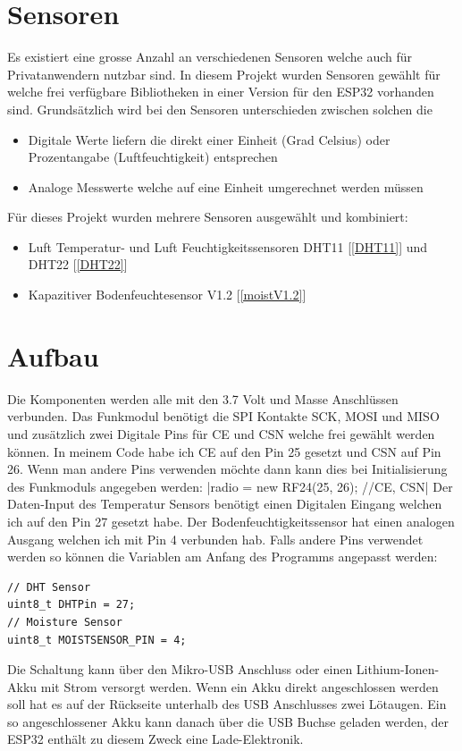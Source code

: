 \documentclass[
  12pt, %
  a4paper, %
  twoside, %
  openany, %
  numbers=noenddot, %
  BCOR=5mm, %
  parskip=half*, %
  thesis, %
]{bfhbook}
\begin{document}
\section{Sensoren}
 Es existiert eine grosse Anzahl an verschiedenen Sensoren welche auch für Privatanwendern nutzbar sind. In diesem Projekt wurden Sensoren gewählt für welche frei verfügbare Bibliotheken in einer Version für den ESP32 vorhanden sind. Grundsätzlich wird bei den Sensoren unterschieden zwischen solchen die 
 \begin{itemize}
	 \item Digitale Werte liefern die direkt einer Einheit (Grad Celsius) oder Prozentangabe (Luftfeuchtigkeit) entsprechen
	  \item Analoge Messwerte welche auf eine Einheit umgerechnet werden müssen
\end{itemize}
Für dieses Projekt wurden mehrere Sensoren ausgewählt und kombiniert:
\begin{itemize}
	\item Luft Temperatur- und Luft Feuchtigkeitssensoren DHT11 [\ref{DHT11}] und DHT22 [\ref{DHT22}]
	\item Kapazitiver Bodenfeuchtesensor V1.2 [\ref{moistV1.2}]
\end{itemize}
\section{Aufbau}
Die Komponenten werden alle mit den 3.7 Volt und Masse Anschlüssen verbunden. Das Funkmodul benötigt die SPI Kontakte SCK, MOSI und MISO und zusätzlich zwei Digitale Pins für CE und CSN welche frei gewählt werden können. In meinem Code habe ich CE auf den Pin 25 gesetzt und CSN auf Pin 26. Wenn man andere Pins verwenden möchte dann kann dies bei Initialisierung des Funkmoduls angegeben werden: |radio = new RF24(25, 26); //CE, CSN|
Der Daten-Input des Temperatur Sensors benötigt einen Digitalen Eingang welchen ich auf den Pin 27 gesetzt habe. Der Bodenfeuchtigkeitssensor hat einen analogen Ausgang welchen ich mit Pin 4 verbunden hab. Falls andere Pins verwendet werden so können die Variablen am Anfang des Programms angepasst werden:
\begin{verbatim}
// DHT Sensor
uint8_t DHTPin = 27;
// Moisture Sensor
uint8_t MOISTSENSOR_PIN = 4;
\end{verbatim}
Die Schaltung kann über den Mikro-USB Anschluss oder einen Lithium-Ionen-Akku mit Strom versorgt werden. Wenn ein Akku direkt angeschlossen werden soll hat es auf der Rückseite  unterhalb des USB Anschlusses zwei Lötaugen. Ein so angeschlossener Akku kann danach über die USB Buchse geladen werden, der ESP32 enthält zu diesem Zweck eine Lade-Elektronik.
\end{document}
